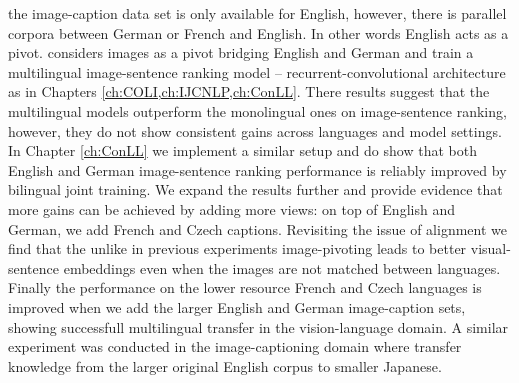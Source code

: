 the image-caption data set is only available for English, however, there is parallel corpora between German
or French and English. In other words English acts as a pivot.
\cite{gella2017image} considers images as a pivot bridging English and German and train a multilingual
image-sentence ranking model -- recurrent-convolutional architecture as in Chapters \ref{ch:COLI,ch:IJCNLP,ch:ConLL}.
There results suggest that the multilingual models outperform the monolingual ones on image-sentence
ranking, however, they do not show consistent gains across languages and model settings.
In Chapter \ref{ch:ConLL} we implement a similar setup and do show that both English and German image-sentence
ranking performance is reliably improved by bilingual joint training. We expand the results further and
provide evidence that more gains can be achieved by adding more views: on top of English and German, we
add French and Czech captions. Revisiting the issue of alignment we find that the unlike in previous
experiments \cite{gella2017image,calixto2017multilingual,rotman2018bridging} image-pivoting leads to
better visual-sentence embeddings even when the images are not matched between languages. Finally
the performance on the lower resource French and Czech languages is improved when we add the larger
English and German image-caption sets, showing successfull multilingual transfer in the vision-language
domain. A similar experiment was conducted in the image-captioning domain where \cite{miyazaki2016cross}
transfer knowledge from the larger original English corpus to smaller Japanese.






